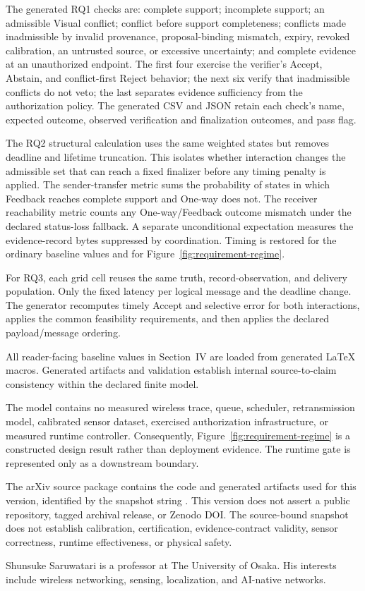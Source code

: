 The \FrameworkStructuralCheckCount{} generated RQ1 checks are: complete
support; incomplete support; an admissible Visual conflict; conflict before
support completeness; conflicts made inadmissible by invalid provenance,
proposal-binding mismatch, expiry, revoked calibration, an untrusted source,
or excessive uncertainty; and complete evidence at an unauthorized endpoint.
The first four exercise the verifier's Accept, Abstain, and conflict-first
Reject behavior; the next six verify that inadmissible conflicts do not veto;
the last separates evidence sufficiency from the authorization policy. The
generated CSV and JSON retain each check's name, expected outcome, observed
verification and finalization outcomes, and pass flag.

The RQ2 structural calculation uses the same weighted states but removes
deadline and lifetime truncation. This isolates whether interaction changes the
admissible set that can reach a fixed finalizer before any timing penalty is
applied. The sender-transfer metric sums the probability of states in which
Feedback reaches complete support and One-way does not. The receiver
reachability metric counts any One-way/Feedback outcome mismatch under the
declared status-loss fallback. A separate unconditional expectation measures
the evidence-record bytes suppressed by coordination. Timing is restored for
the ordinary baseline values and for Figure~\ref{fig:requirement-regime}.

For RQ3, each grid cell reuses the same truth, record-observation, and delivery
population. Only the fixed latency per logical message and the deadline change.
The generator recomputes timely Accept and selective error for both
interactions, applies the common feasibility requirements, and then applies the
declared payload/message ordering.

All reader-facing baseline values in Section~IV are loaded from generated
LaTeX macros. Generated artifacts and validation establish internal
source-to-claim consistency within the declared finite model.

The model contains no measured wireless trace, queue, scheduler, retransmission
model, calibrated sensor dataset, exercised authorization infrastructure, or
measured runtime controller. Consequently, Figure~\ref{fig:requirement-regime}
is a constructed design result rather than deployment evidence. The runtime
gate is represented only as a downstream boundary.

The arXiv source package contains the code and generated artifacts used for this
version, identified by the snapshot string \texttt{\ArtifactReleaseID}. This
version does not assert a public repository,
tagged archival release, or Zenodo DOI. The source-bound snapshot does not
establish calibration, certification, evidence-contract validity, sensor
correctness, runtime effectiveness, or physical safety.




\begin{IEEEbiographynophoto}{Shunsuke Saruwatari}
is a professor at The University of Osaka. His interests include wireless
networking, sensing, localization, and AI-native networks.
\end{IEEEbiographynophoto}

